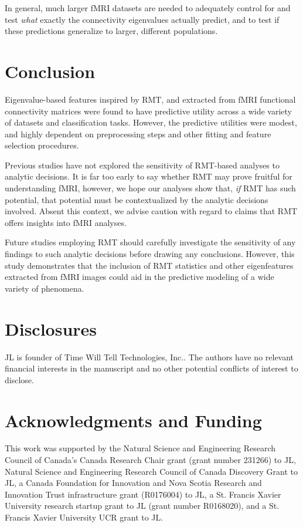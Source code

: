 \documentclass[12pt]{spieman}  %
\begin{document}
\begin{spacing}{2}
In general, much larger fMRI datasets are needed to adequately control for and
test \textit{what} exactly the connectivity eigenvalues actually predict, and
to test if these predictions generalize to larger, different populations.



\section{Conclusion}

Eigenvalue-based features inspired by RMT, and extracted from fMRI functional
connectivity matrices were found to have predictive utility across a wide
variety of datasets and classification tasks. However, the predictive utilities
were modest, and highly dependent on preprocessing steps and other fitting and
feature selection procedures.

\color{cyan}
Previous studies have not explored the sensitivity of RMT-based analyses to
analytic decisions. It is far too early to say whether RMT may prove fruitful
for understanding fMRI, however, we hope our analyses show that, \textit{if}
RMT has such potential, that potential must be contextualized by the analytic
decisions involved. Absent this context, we advise caution with regard to
claims that RMT offers insights into fMRI analyses.


\color{black}


Future studies employing RMT should carefully
investigate the sensitivity of any findings to such analytic decisions before
drawing any conclusions. However, this study demonstrates that the inclusion of
RMT statistics and other eigenfeatures extracted from fMRI images could aid in
the predictive modeling of a wide variety of phenomena.



\newpage



\section*{Disclosures}
JL is founder of Time Will Tell Technologies, Inc.. The authors have no
relevant financial interests in the manuscript and no other potential conflicts
of interest to disclose.



\section*{Acknowledgments and Funding}
This work was supported by the Natural Science and Engineering Research
Council of Canada's Canada Research Chair grant (grant number 231266) to JL,
Natural Science and Engineering Research Council of Canada Discovery Grant to
JL, a Canada Foundation for Innovation and Nova Scotia Research and Innovation
Trust infrastructure grant (R0176004) to JL, a St. Francis Xavier University
research startup grant to JL (grant number R0168020), and a St. Francis Xavier
University UCR grant to JL.




\end{spacing}
\end{document}
